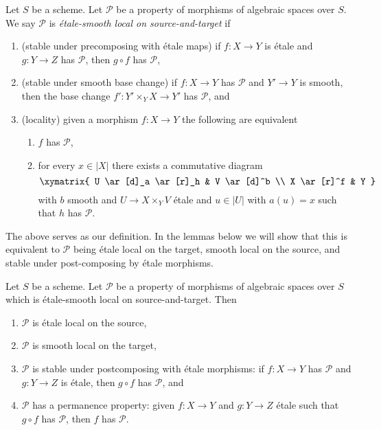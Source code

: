 \begin{definition}
\label{definition-etale-smooth-local-source-target}
Let $S$ be a scheme.
Let $\mathcal{P}$ be a property of morphisms of algebraic spaces over $S$.
We say $\mathcal{P}$ is {\it \'etale-smooth local on source-and-target} if
\begin{enumerate}
\item (stable under precomposing with \'etale maps)
if $f : X \to Y$ is \'etale and $g : Y \to Z$ has $\mathcal{P}$,
then $g \circ f$ has $\mathcal{P}$,
\item (stable under smooth base change)
if $f : X \to Y$ has $\mathcal{P}$ and $Y' \to Y$ is smooth, then
the base change $f' : Y' \times_Y X \to Y'$ has $\mathcal{P}$, and
\item (locality) given a morphism $f : X \to Y$ the following are
equivalent
\begin{enumerate}
\item $f$ has $\mathcal{P}$,
\item for every $x \in |X|$ there exists a commutative diagram
$$
\xymatrix{
U \ar[d]_a \ar[r]_h & V \ar[d]^b \\
X \ar[r]^f & Y
}
$$
with $b$ smooth and $U \to X \times_Y V$ \'etale
and $u \in |U|$ with $a(u) = x$ such that
$h$ has $\mathcal{P}$.
\end{enumerate}
\end{enumerate}
\end{definition}

\noindent
The above serves as our definition. In the lemmas below we will show that
this is equivalent to $\mathcal{P}$ being \'etale local on the target,
smooth local on the source, and stable under post-composing by
\'etale morphisms.

\begin{lemma}
\label{lemma-etale-smooth-local-source-target-implies}
Let $S$ be a scheme.
Let $\mathcal{P}$ be a property of morphisms of algebraic spaces over $S$
which is \'etale-smooth local on source-and-target. Then
\begin{enumerate}
\item $\mathcal{P}$ is \'etale local on the source,
\item $\mathcal{P}$ is smooth local on the target,
\item $\mathcal{P}$ is stable under postcomposing with \'etale morphisms:
if $f : X \to Y$ has $\mathcal{P}$ and $g : Y \to Z$ is \'etale, then
$g \circ f$ has $\mathcal{P}$, and
\item $\mathcal{P}$ has a permanence property: given $f : X \to Y$ and
$g : Y \to Z$ \'etale such that $g \circ f$ has $\mathcal{P}$, then
$f$ has $\mathcal{P}$.
\end{enumerate}
\end{lemma}

